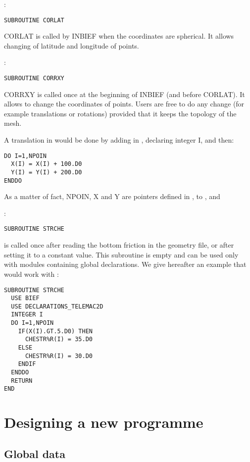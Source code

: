 :
\begin{lstlisting}[language=TelFortran]
SUBROUTINE CORLAT
\end{lstlisting}

CORLAT is called by INBIEF when the coordinates are spherical. It allows
changing of latitude and longitude of points.

:
\begin{lstlisting}[language=TelFortran]
SUBROUTINE CORRXY
\end{lstlisting}

CORRXY is called once at the beginning of INBIEF (and before CORLAT). It allows
to change the coordinates of points. Users are free to do any change (for
example translations or rotations) provided that it keeps the topology of the
mesh.

A translation in  would be done by adding  in , declaring integer I, and then:
\begin{lstlisting}[language=TelFortran]
DO I=1,NPOIN
  X(I) = X(I) + 100.D0
  Y(I) = Y(I) + 200.D0
ENDDO
\end{lstlisting}

As a matter of fact, NPOIN, X and Y are pointers defined in
, to , 
 and 

:
\begin{lstlisting}[language=TelFortran]
SUBROUTINE STRCHE
\end{lstlisting}

 is called once after reading the bottom friction in the
geometry file, or after setting it to a constant value. This subroutine is
empty and can be used only with modules containing global declarations. We give
hereafter an example that would work with :
\begin{lstlisting}[language=TelFortran]
SUBROUTINE STRCHE
  USE BIEF
  USE DECLARATIONS_TELEMAC2D
  INTEGER I
  DO I=1,NPOIN
    IF(X(I).GT.5.D0) THEN
      CHESTR%R(I) = 35.D0
    ELSE
      CHESTR%R(I) = 30.D0
    ENDIF
  ENDDO
  RETURN
END
\end{lstlisting}

\section{Designing a new programme}

\subsection{Global data}

